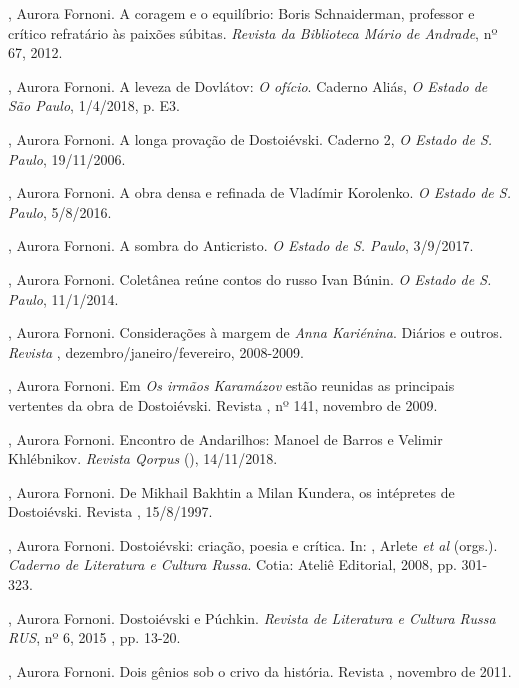 \begin{Parskip}
{, Aurora Fornoni. A coragem e o equilíbrio: Boris Schnaiderman, professor e crítico refratário às paixões súbitas. \emph{Revista da Biblioteca Mário de Andrade}, nº 67, 2012.

, Aurora Fornoni. A leveza de Dovlátov: \emph{O ofício}. Caderno Aliás, \emph{O Estado de São Paulo}, 1/4/2018, p. E3.

, Aurora Fornoni. A longa provação de Dostoiévski. Caderno 2, \emph{O Estado de S. Paulo}, 19/11/2006.

, Aurora Fornoni. A obra densa e refinada de Vladímir Korolenko. \emph{O Estado de S. Paulo}, 5/8/2016.

, Aurora Fornoni. A sombra do Anticristo. \emph{O Estado de S. Paulo}, 3/9/2017.

, Aurora Fornoni. Coletânea reúne contos do russo Ivan Búnin. \emph{O Estado de S. Paulo}, 11/1/2014.

, Aurora Fornoni. Considerações à margem de \emph{Anna Kariénina}. Diários e outros. \emph{Revista }, dezembro/janeiro/fevereiro, 2008-2009.

, Aurora Fornoni. Em \emph{Os irmãos Karamázov} estão reunidas as principais vertentes da obra de Dostoiévski. Revista , nº 141, novembro de 2009.

, Aurora Fornoni. Encontro de Andarilhos: Manoel de Barros e Velimir Khlébnikov. \emph{Revista Qorpus} (), 14/11/2018.

, Aurora Fornoni. De Mikhail Bakhtin a Milan Kundera, os intépretes de Dostoiévski. Revista , 15/8/1997.

, Aurora Fornoni. Dostoiévski: criação, poesia e crítica. In: , Arlete \emph{et al} (orgs.). \emph{Caderno de Literatura e Cultura Russa}. Cotia: Ateliê Editorial, 2008, pp. 301-323.

, Aurora Fornoni. Dostoiévski e Púchkin. \emph{Revista de Literatura e Cultura Russa \emph{RUS}}, nº 6, 2015 , pp. 13-20.

, Aurora Fornoni. Dois gênios sob o crivo da história. Revista , novembro de 2011.

}
\end{Parskip}
